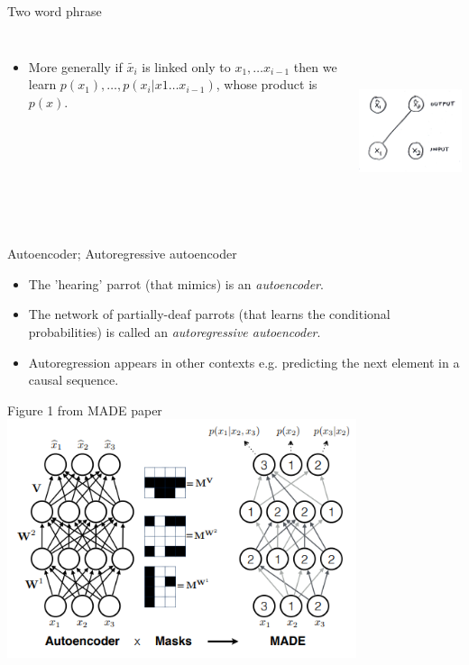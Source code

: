 \documentclass[usenames,dvipsnames]{beamer}
\begin{document}
\begin{frame}{Two word phrase}
	\begin{columns}
    \begin{itemize}
    \item{More generally if $\tilde{x_i}$ is linked only to $x_1, \dots x_{i-1}$ then we learn $p(x_1), \dots, p(x_i | x1 \dots x_{i-1})$, whose product is $p(x)$.}
    \end{itemize}
             \centering
             \includegraphics[height=5cm]{image_03}
         \end{columns} 
\end{frame}

\begin{frame}{Autoencoder; Autoregressive autoencoder}
    \begin{itemize}
      \item{The 'hearing' parrot (that mimics) is an \textit{autoencoder}.}
	\item{The network of partially-deaf parrots (that learns the conditional probabilities) is called an \textit{autoregressive autoencoder}.}
	\item{Autoregression appears in other contexts e.g. predicting the next element in a causal sequence.}
    \end{itemize}
\end{frame}

\begin{frame}{Figure 1 from MADE paper}
     \centering
     \includegraphics[height=7cm]{image_04}
\end{frame}
\end{document}
